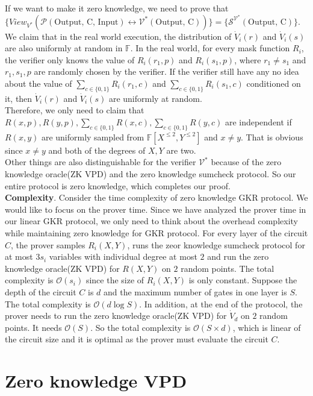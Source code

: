 If we want to make it zero knowledge, we need to prove that $\{View_{V^*}(\mathcal{P}(\text{Output, C, Input}) \leftrightarrow \mathcal{V^*}(\text{Output, C}))\} = \{\mathcal{S}^{\mathcal{V^*}}(\text{Output, C})\}$. We claim that in the real world execution, the distribution of $\dot{V}_i(r)$ and $\dot{V}_i(s)$ are also uniformly at random in $\mathbb{F}$. In the real world, for every mask function $R_i$, the verifier only knows the value of $R_i(r_1, p)$ and $R_i(s_1, p)$, where $r_1 \neq s_1$ and $r_1, s_1, p$ are randomly chosen by the verifier. If the verifier still have any no idea about the value of $\sum\limits_{c \in \{0, 1\}}R_i(r_1, c)$ and $\sum\limits_{c \in \{0, 1\}}R_i(s_1, c)$ conditioned on it, then $\dot{V}_i(r)$ and $\dot{V}_i(s)$ are uniformly at random.\\

Therefore, we only need to claim that $R(x, p), R(y, p), \sum\limits_{c \in \{0, 1\}}R(x, c), \sum\limits_{c \in \{0, 1\}}R(y, c)$ are independent if $R(x, y)$ are uniformly sampled from $\mathbb{F}[X^{\leqslant 2}, Y^{\leqslant 2}]$ and $x \neq y$. That is obvious since $x \neq y$ and both of the degrees of $X, Y$ are two.\\

Other things are also distinguishable for the verifier $\mathcal{V^*}$ because of the zero knowledge oracle(ZK VPD) and the zero knowledge sumcheck protocol. So our entire protocol is zero knowledge, which completes our proof.\\

\noindent
\textbf{Complexity}. Consider the time complexity of zero knowledge GKR protocol. We would like to focus on the prover time. Since we have analyzed the prover time in our linear GKR protocol, we only need to think about the overhead complexity while maintaining zero knowledge for GKR protocol. For every layer of the circuit $C$, the prover samples $R_i(X, Y)$, runs the zeor knowledge sumcheck protocol for at most $3s_i$ variables with individual degree at most $2$ and run the zero knowledge oracle(ZK VPD) for $R(X, Y)$ on $2$ random points. The total complexity is $\mathcal{O}(s_i)$ since the size of $R_i(X, Y)$ is only constant. Suppose the depth of the circuit $C$ is $d$ and the maximum number of gates in one layer is $S$. The total complexity is $\mathcal{O}(d \log S)$. In addition, at the end of the protocol, the prover needs to run the zero knowledge oracle(ZK VPD) for $\dot{V}_d$ on $2$ random points. It needs $\mathcal{O}(S)$. So the total complexity is $\mathcal{O}(S \times d)$, which is linear of the circuit size and it is optimal as the prover must evaluate the circuit $C$. 

\section{Zero knowledge VPD}

















